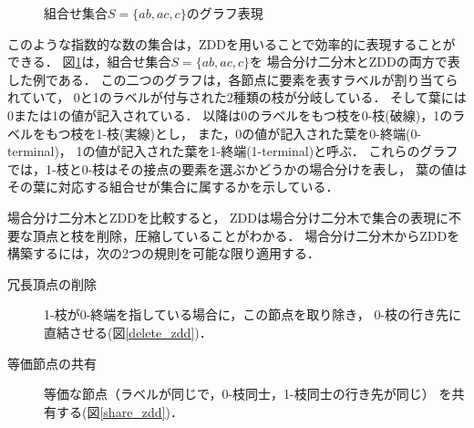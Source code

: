 \begin{figure}[htbp]
\begin{minipage}[b]{0.48\hsize}
    \label{zdd_graph}
  \end{minipage}
  \caption{組合せ集合$S=\{ab,ac,c\}$のグラフ表現}\label{combined_set}
\end{figure}

このような指数的な数の集合は，ZDDを用いることで効率的に表現することができる．
図\ref{combined_set}は，組合せ集合$S=\{ab,ac,c\}$を
場合分け二分木とZDDの両方で表した例である．
この二つのグラフは，各節点に要素を表すラベルが割り当てられていて，
0と1のラベルが付与された2種類の枝が分岐している．
そして葉には0または1の値が記入されている．
以降は0のラベルをもつ枝を0-枝(破線)，1のラベルをもつ枝を1-枝(実線)とし，
また，0の値が記入された葉を0-終端(0-terminal)，
1の値が記入された葉を1-終端(1-terminal)と呼ぶ．
これらのグラフでは，1-枝と0-枝はその接点の要素を選ぶかどうかの場合分けを表し，
葉の値はその葉に対応する組合せが集合に属するかを示している．

場合分け二分木とZDDを比較すると，
ZDDは場合分け二分木で集合の表現に不要な頂点と枝を削除，圧縮していることがわかる．
場合分け二分木からZDDを構築するには，次の2つの規則を可能な限り適用する．

\begin{description}
  \item[冗長頂点の削除] 1-枝が0-終端を指している場合に，この節点を取り除き，
  0-枝の行き先に直結させる(図\ref{delete_zdd})．
  \item[等価節点の共有] 等価な節点（ラベルが同じで，0-枝同士，1-枝同士の行き先が同じ）
  を共有する(図\ref{share_zdd})．
\end{description}

